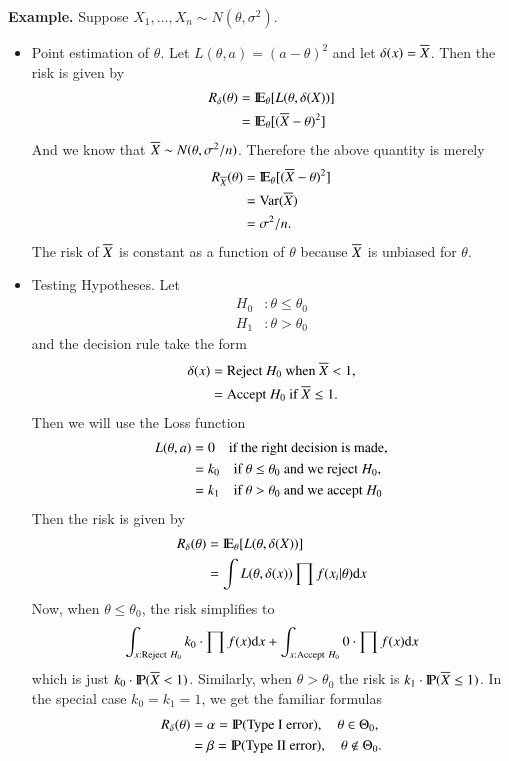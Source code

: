 \documentclass[captions=tableheading]{scrbook}
\begin{document}
\textbf{Example.} Suppose $X_{1},\ldots,X_{n}\sim N(\theta,\sigma^{2})$.

\begin{itemize}
\item Point estimation of $\theta$. Let $L(\theta,a)=(a-\theta)^{2}$ and let $\delta(x)=\Xbar$. Then the risk is given by 
   \begin{align*}
   R_{\delta}(\theta) & =\E_{\theta}[L(\theta,\delta(X))]\\
   & =\E_{\theta}[(\Xbar-\theta)^{2}]
   \end{align*}
   And we know that $\Xbar\sim N(\theta,\sigma^{2}/n)$. Therefore the above quantity is merely 
   \begin{align*}
   R_{\Xbar}(\theta) & =\E_{\theta}[(\Xbar-\theta)^{2}]\\
   & =\mathrm{Var}(\Xbar)\\
   & =\sigma^{2}/n.
   \end{align*}
   The risk of $\Xbar$ is constant as a function of $\theta$ because $\Xbar$ is unbiased for $\theta$.
\item Testing Hypotheses. Let 
   \begin{align*}
   H_{0} & :\theta \leq \theta_{0}\\
   H_{1} & :\theta > \theta_{0}
   \end{align*}
   and the decision rule take the form 
   \begin{align*}
   \delta(x) & =\mbox{Reject \ensuremath{H_{0}} when \ensuremath{\Xbar<1},}\\
 & =\mbox{Accept \ensuremath{H_{0}} if \ensuremath{\Xbar\leq1}.}
   \end{align*}
   Then we will use the Loss function 
   \begin{align*}
   L(\theta,a) & =0\quad\mbox{if the right decision is made,}\\
 & =k_{0}\quad\mbox{if \ensuremath{\theta\leq\theta_{0}} and we reject \ensuremath{H_{0}},}\\
 & =k_{1}\quad\mbox{if \ensuremath{\theta>\theta_{0}} and we accept \ensuremath{H_{0}}}
   \end{align*}
   Then the risk is given by 
   \begin{align*}
   R_{\delta}(\theta) & =\E_{\theta}[L(\theta,\delta(X))]\\
   & =\int L(\theta,\delta(x))\prod f(x_{i}|\theta)\diff x
   \end{align*}
   Now, when $\theta \leq \theta_{0}$, the risk simplifies to 
   \[
   \int_{x:\mathrm{Reject}\ H_{0}}k_{0}\cdot\prod f(x)\diff x+\int_{x:\mathrm{Accept}\ H_{0}}0\cdot\prod f(x)\diff x
   \]
   which is just $k_{0}\cdot\P(\Xbar<1)$. Similarly, when $\theta>\theta_{0}$ the risk is \newline $k_{1}\cdot\P(\Xbar\leq1)$. In the special case $k_{0}=k_{1}=1$, we get the familiar formulas 
   \begin{align*}
   R_{\delta}(\theta) & =\alpha=\P(\mbox{Type I error}),\quad\theta\in\Theta_{0},\\
 & =\beta=\P(\mbox{Type II error}),\quad\theta\notin\Theta_{0}.
   \end{align*}
\end{itemize}
\end{document}
